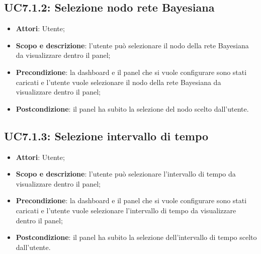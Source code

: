 \subsection{UC7.1.2: Selezione nodo rete Bayesiana }
\hypertarget{UC7.1.2}{}
\begin{itemize}
	\item \textbf{Attori}: Utente;
	\item \textbf{Scopo e descrizione}: l'utente può selezionare il nodo della rete Bayesiana da visualizzare dentro il panel;
	\item \textbf{Precondizione}: la dashboard e il panel che si vuole configurare sono stati caricati e l'utente vuole selezionare il nodo della rete Bayesiana da visualizzare dentro il panel;
	\item \textbf{Postcondizione}: il panel ha subito la selezione del nodo scelto dall'utente.
\end{itemize}
\subsection{UC7.1.3: Selezione intervallo di tempo  }
\hypertarget{UC7.1.3}{}
\begin{itemize}
	\item \textbf{Attori}: Utente;
	\item \textbf{Scopo e descrizione}: l'utente può selezionare l'intervallo di tempo da visualizzare dentro il panel;
	\item \textbf{Precondizione}: la dashboard e il panel che si vuole configurare sono stati caricati e l'utente vuole selezionare l'intervallo di tempo da visualizzare dentro il panel;
	\item \textbf{Postcondizione}: il panel ha subito la selezione dell'intervallo di tempo scelto dall'utente.
\end{itemize}

